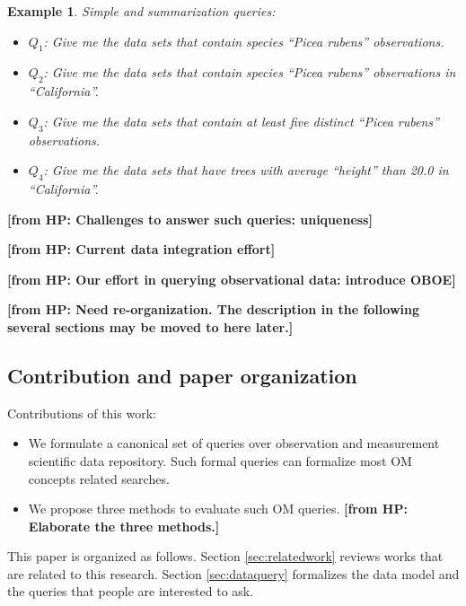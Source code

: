 \documentclass[conference]{IEEEtran}
\newtheorem{example}{\bf Example}[section]
\newcommand{\from}[2]{{\bf[{\sc from #1:} #2]}}
\begin{document}
\begin{example}\label{eg:query}
Simple and summarization queries: 
\begin{itemize}
\item $Q_1$: Give me the data sets that contain species ``Picea rubens'' observations.
\item $Q_2$: Give me the data sets that contain species ``Picea rubens''
  observations in ``California''. 
\item $Q_3$: Give me the data sets that contain at least five distinct
  ``Picea rubens'' observations.
\item $Q_4$: Give me the data sets that have trees with average ``height''
  than 20.0 in ``California''. 
\end{itemize}
\end{example}
\from{HP}{Challenges to answer such queries: uniqueness}

\from{HP}{Current data integration effort}

\from{HP}{Our effort in querying observational data: introduce OBOE}

\from{HP}{Need re-organization. The description in the
  following several sections may be moved to here later.}

\subsection{Contribution and paper organization}
Contributions of this work:
\begin{itemize}
\item We formulate a canonical set of queries over observation and
  measurement scientific data repository. Such formal queries can
  formalize most OM concepts related searches. 
\item We propose three methods to evaluate such OM
  queries. \from{HP}{Elaborate the three methods.}
\end{itemize}

This paper is organized as follows. 
Section \ref{sec:relatedwork} reviews works that are related to this
research. Section \ref{sec:dataquery} formalizes the data model and the
queries that people are interested to ask.  
\end{document}
